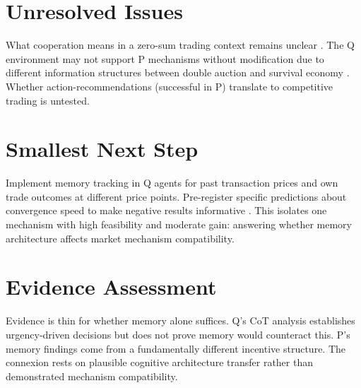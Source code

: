 \documentclass{article}
\begin{document}
\section*{Unresolved Issues}

What cooperation means in a zero-sum trading context remains unclear . The Q environment may not support P mechanisms without modification due to different information structures between double auction and survival economy . Whether action-recommendations (successful in P) translate to competitive trading is untested.

\section*{Smallest Next Step}

Implement memory tracking in Q agents for past transaction prices and own trade outcomes at different price points. Pre-register specific predictions about convergence speed to make negative results informative . This isolates one mechanism with high feasibility and moderate gain: answering whether memory architecture affects market mechanism compatibility.

\section*{Evidence Assessment}

Evidence is thin for whether memory alone suffices. Q's CoT analysis establishes urgency-driven decisions but does not prove memory would counteract this. P's memory findings come from a fundamentally different incentive structure. The connexion rests on plausible cognitive architecture transfer rather than demonstrated mechanism compatibility.
\end{document}
